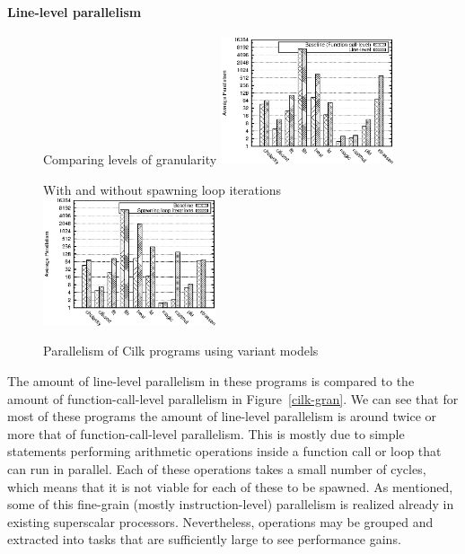 \paragraph{Line-level parallelism}

\begin{figure}[t]
 \begin{center}
  \begin{SubFloat}{\label{cilk-gran}Comparing levels of granularity}
   \includegraphics[width=2.0in]{cilk-gran}
  \end{SubFloat}
 \qquad
  \begin{SubFloat}{\label{cilk-loop}With and without spawning loop iterations}
   \includegraphics[width=2.0in]{cilk-loop}
  \end{SubFloat}
 \end{center}
 \caption{Parallelism of Cilk programs using variant models}
\end{figure}

The amount of line-level parallelism in these programs is compared to the amount of function-call-level parallelism in Figure~\ref{cilk-gran}.
We can see that for most of these programs the amount of line-level parallelism is around twice or more that of function-call-level parallelism.
This is mostly due to simple statements performing arithmetic operations inside a function call or loop that can run in parallel.
Each of these operations takes a small number of cycles, which means that it is not viable for each of these to be spawned.
As mentioned, some of this fine-grain (mostly instruction-level) parallelism is realized already in existing superscalar processors.
Nevertheless, operations may be grouped and extracted into tasks that are sufficiently large to see performance gains.

